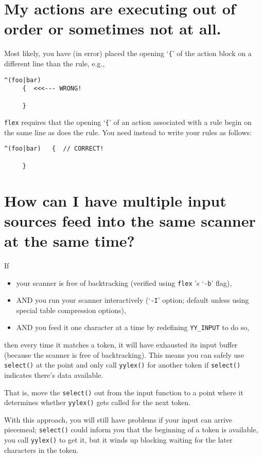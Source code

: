 \documentclass[openany,oneside]{book}
\begin{document}
\section{My actions are executing out of order or sometimes not at all.}


Most likely, you have (in error) placed the opening ‘\verb`{`’ of the action
block on a different line than the rule, e.g.,
\begin{verbatim}
^(foo|bar)
     {  <<<--- WRONG!
     
     }
\end{verbatim}


 \verb`flex` requires that the opening ‘\verb`{`’ of an action associated with a rule
begin on the same line as does the rule.  You need instead to write your rules
as follows:
\begin{verbatim}
^(foo|bar)   {  // CORRECT!
     
     }
\end{verbatim}

\section{How can I have multiple input sources feed into the same scanner at the same time?}


If
\begin{itemize}
\item your scanner is free of backtracking (verified using \verb`flex` 's ‘\verb`-b`’ flag),
\item AND you run your scanner interactively (‘\verb`-I`’ option; default unless using special table
compression options),
\item AND you feed it one character at a time by redefining \verb`YY_INPUT` to do so,
\end{itemize}


then every time it matches a token, it will have exhausted its input
buffer (because the scanner is free of backtracking).  This means you
can safely use \verb`select()` at the point and only call \verb`yylex()` for another
token if \verb`select()` indicates there's data available.

That is, move the \verb`select()` out from the input function to a point where
it determines whether \verb`yylex()` gets called for the next token.

With this approach, you will still have problems if your input can arrive
piecemeal; \verb`select()` could inform you that the beginning of a token is
available, you call \verb`yylex()` to get it, but it winds up blocking waiting
for the later characters in the token.
\end{document}
